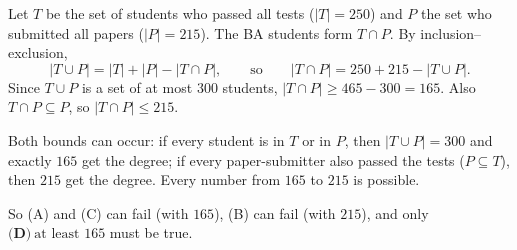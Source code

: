 Let $T$ be the set of students who passed all tests ($|T|=250$) and $P$ the set who submitted all papers ($|P|=215$). The BA students form $T\cap P$. By inclusion--exclusion,
\[
|T\cup P|=|T|+|P|-|T\cap P|,\qquad\text{so}\qquad |T\cap P|=250+215-|T\cup P| .
\]
Since $T\cup P$ is a set of at most $300$ students, $|T\cap P|\ge465-300=165$. Also $T\cap P\subseteq P$, so $|T\cap P|\le215$.

Both bounds can occur: if every student is in $T$ or in $P$, then $|T\cup P|=300$ and exactly $165$ get the degree; if every paper-submitter also passed the tests ($P\subseteq T$), then $215$ get the degree. Every number from $165$ to $215$ is possible.

So (A) and (C) can fail (with $165$), (B) can fail (with $215$), and only $\boxed{\textbf{(D)}\ \text{at least }165}$ must be true.
